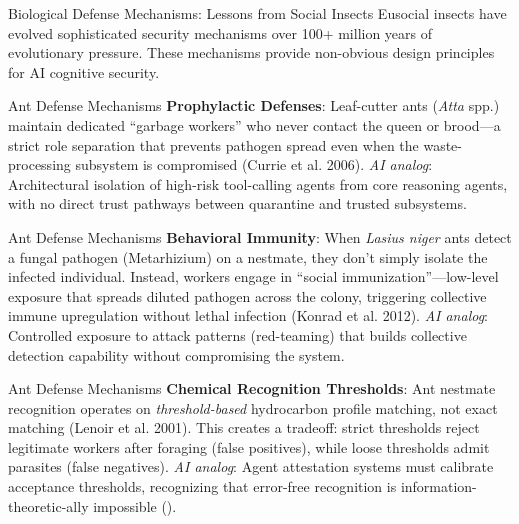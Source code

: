 \documentclass[
  ignorenonframetext,
]{beamer}
\providecommand{\cref}[1]{\texttt{\detokenize{#1}}}
\begin{document}
\begin{frame}[allowframebreaks]{Biological Defense Mechanisms: Lessons
from Social Insects}
Eusocial insects have evolved sophisticated security mechanisms over
100+ million years of evolutionary pressure. These mechanisms provide
non-obvious design principles for AI cognitive security.
\end{frame}

\begin{frame}[allowframebreaks]{Ant Defense Mechanisms}
\protect{}\label{sec:ant-defenses}
\textbf{Prophylactic Defenses}: Leaf-cutter ants (\emph{Atta} spp.)
maintain dedicated ``garbage workers'' who never contact the queen or
brood---a strict role separation that prevents pathogen spread even when
the waste-processing subsystem is compromised (Currie et al. 2006).
\emph{AI analog}: Architectural isolation of high-risk tool-calling
agents from core reasoning agents, with no direct trust pathways between
quarantine and trusted subsystems.

\end{frame}

\begin{frame}[allowframebreaks]{Ant Defense Mechanisms}
\textbf{Behavioral Immunity}: When \emph{Lasius niger} ants detect a
fungal pathogen (Metarhizium) on a nestmate, they don't simply isolate
the infected individual. Instead, workers engage in ``social
immunization''---low-level exposure that spreads diluted pathogen across
the colony, triggering collective immune upregulation without lethal
infection ({Konrad et al.} 2012). \emph{AI analog}: Controlled exposure
to attack patterns (red-teaming) that builds collective detection
capability without compromising the system.

\end{frame}

\begin{frame}[allowframebreaks]{Ant Defense Mechanisms}
\textbf{Chemical Recognition Thresholds}: Ant nestmate recognition
operates on \emph{threshold-based} hydrocarbon profile matching, not
exact matching (Lenoir et al. 2001). This creates a tradeoff: strict
thresholds reject legitimate workers after foraging (false positives),
while loose thresholds admit parasites (false negatives). \emph{AI
analog}: Agent attestation systems must calibrate acceptance thresholds,
recognizing that error-free recognition is information-theoretic-ally
impossible (\cref{thm:stealth-impact}).

\end{frame}
\end{document}
